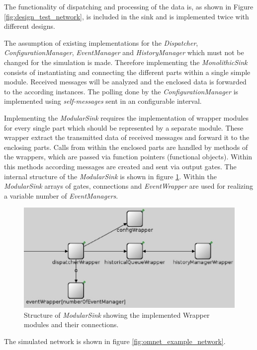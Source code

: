 The functionality of dispatching and processing of the data is, as shown in Figure \ref{fig:design_test_network}, is included in the sink and is implemented twice with different designs.

The assumption of existing implementations for the \emph{Dispatcher}, \emph{ConfigurationManager}, \emph{EventManager} and \emph{HistoryManager} which must not be changed for the simulation is made.
Therefore implementing the \emph{MonolithicSink} consists of instantiating and connecting the different parts within a single simple module.
Received messages will be analyzed and the enclosed data is forwarded to the according instances.
The polling done by the \emph{ConfigurationManager} is implemented using \emph{self-messages} sent in an configurable interval.

Implementing the \emph{ModularSink} requires the implementation of wrapper modules for every single part which should be represented by a separate module.
These wrapper extract the transmitted data of received messages and forward it to the enclosing parts.
Calls from within the enclosed parts are handled by methods of the wrappers, which are passed via function pointers (functional objects).
Within this methods according messages are created and sent via output gates.
The internal structure of the \emph{ModularSink} is shown in figure \ref{fig:ModularSink}.
Within the \emph{ModularSink} arrays of gates, connections and \emph{EventWrapper} are used for realizing a variable number of \emph{EventManagers}.

\begin{figure}
    \centering
    \includegraphics[width=0.9\linewidth]{images/ModularSink}
    \caption{Structure of \emph{ModularSink} showing the implemented Wrapper modules and their connections.}
    \label{fig:ModularSink}
\end{figure}

The simulated network is shown in figure \ref{fig:omnet_example_network}.

